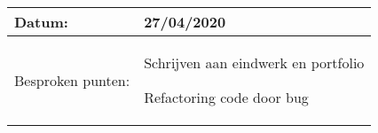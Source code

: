 \begin{tabularx}{\textwidth}{| l | X |}
  \hline
  Datum: & 27/04/2020\\
  \hline
  Besproken punten: &
  \begin{compactitem}
    \item Schrijven aan eindwerk en portfolio
    \item Refactoring code door bug
  \end{compactitem}\\
  \hline
\end{tabularx}